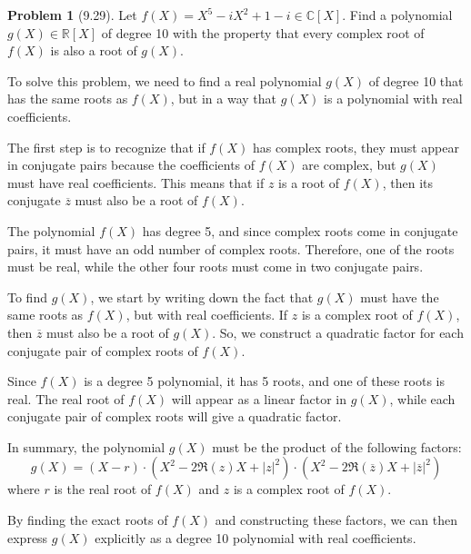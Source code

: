 \documentclass[12pt]{article}
\theoremstyle{definition}
\newtheorem{problem}{Problem}
\begin{document}
\begin{problem}[9.29]
    Let $f(X) = X^5 - iX^2 + 1 - i \in \mathbb{C}[X]$. Find a polynomial $g(X) \in \mathbb{R}[X]$
    of degree 10 with the property that every complex root of $f(X)$ is also a root of $g(X)$.
    
    \begin{solution}
        To solve this problem, we need to find a real polynomial $g(X)$ of degree 10 that has the same roots as $f(X)$, but in a way that $g(X)$ is a polynomial with real coefficients.

        The first step is to recognize that if $f(X)$ has complex roots, they must appear in conjugate pairs because the coefficients of $f(X)$ are complex, but $g(X)$ must have real coefficients. This means that if $z$ is a root of $f(X)$, then its conjugate $\overline{z}$ must also be a root of $f(X)$.

        The polynomial $f(X)$ has degree 5, and since complex roots come in conjugate pairs, it must have an odd number of complex roots. Therefore, one of the roots must be real, while the other four roots must come in two conjugate pairs.

        To find $g(X)$, we start by writing down the fact that $g(X)$ must have the same roots as $f(X)$, but with real coefficients. If $z$ is a complex root of $f(X)$, then $\overline{z}$ must also be a root of $g(X)$. So, we construct a quadratic factor for each conjugate pair of complex roots of $f(X)$.

        Since $f(X)$ is a degree 5 polynomial, it has 5 roots, and one of these roots is real. The real root of $f(X)$ will appear as a linear factor in $g(X)$, while each conjugate pair of complex roots will give a quadratic factor.

        In summary, the polynomial $g(X)$ must be the product of the following factors:
        \[
        g(X) = (X - r) \cdot (X^2 - 2\Re(z)X + |z|^2) \cdot (X^2 - 2\Re(\overline{z})X + |\overline{z}|^2)
        \]
        where $r$ is the real root of $f(X)$ and $z$ is a complex root of $f(X)$.

        By finding the exact roots of $f(X)$ and constructing these factors, we can then express $g(X)$ explicitly as a degree 10 polynomial with real coefficients.
    \end{solution}
\end{problem}
\end{document}

